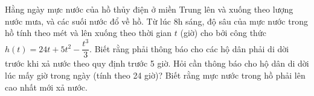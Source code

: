 \begin{vd} %
	Hằng ngày mực nước của hồ thủy điện ở miền Trung lên và xuống theo lượng nước mưa, và các suối nước đổ về hồ. Từ lúc 8h sáng, độ sâu của mực nước trong hồ tính theo mét và lên xuống theo thời gian $t$ (giờ)  cho bởi công thức $h(t)=24t+5t^2-\dfrac{t^3}{3}$. Biết rằng phải thông báo cho các hộ dân phải di dời trước khi xả nước theo quy định trước 5 giờ. Hỏi cần thông báo cho hộ dân di dời lúc mấy giờ trong ngày (tính theo 24 giờ)? Biết rằng mực nước trong hồ phải lên cao nhất mới xả nước.
\end{vd}
